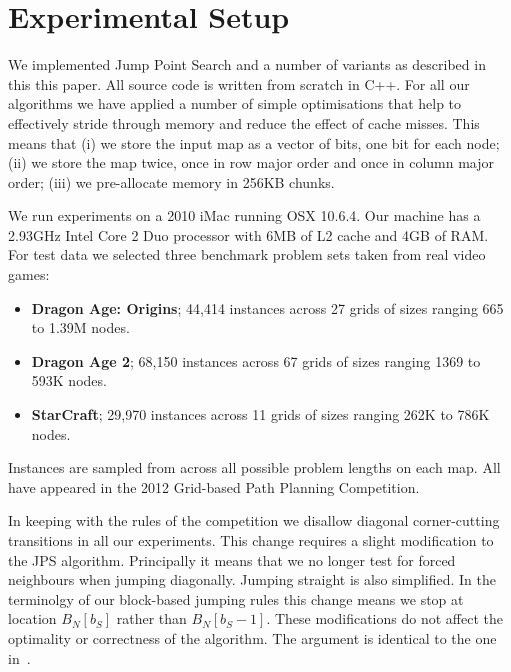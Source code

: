 

\section{Experimental Setup}
\label{sec::setup}
We implemented Jump Point Search and a number of variants as described
in this this paper. All source code is written from scratch in C++.
For all our algorithms we have applied a number of simple optimisations 
that help to effectively stride through memory and reduce the effect of 
cache misses.
This means that (i) we store the input map as a vector of bits, one bit 
for each node; (ii) we store the map twice, once in row major order and 
once in column major order; (iii) we pre-allocate memory in 256KB chunks.

We run experiments on a 2010 iMac running OSX 10.6.4. Our machine has 
a 2.93GHz Intel Core 2 Duo processor with 6MB of L2 cache and 4GB of RAM.
For test data we selected three benchmark problem sets taken from
real video games: 
\begin{itemize}
\item \textbf{Dragon Age: Origins}; 44,414 instances across 27 grids of 
sizes ranging 665 to 1.39M nodes.
\item \textbf{Dragon Age 2}; 68,150 instances across 67 grids of sizes 
ranging 1369 to 593K nodes.
\item \textbf{StarCraft}; 29,970 instances across 11 grids of sizes 
ranging 262K to 786K nodes.
\end{itemize}
Instances are sampled from across all possible problem lengths on each map.
All have appeared in the 2012 Grid-based Path Planning Competition. 

In keeping with the rules of the competition we disallow diagonal
corner-cutting transitions in all our experiments.  This change requires a
slight modification to the JPS algorithm.  Principally it means that we no
longer test for forced neighbours when jumping diagonally.
Jumping straight is also simplified. In the terminolgy of our block-based
jumping rules this change means we stop at location $B_N[b_S]$ rather than
$B_N[b_S-1]$.  These modifications do not affect the optimality or 
correctness of the algorithm. The argument is identical to the one
in~\cite{harabor11b}.
